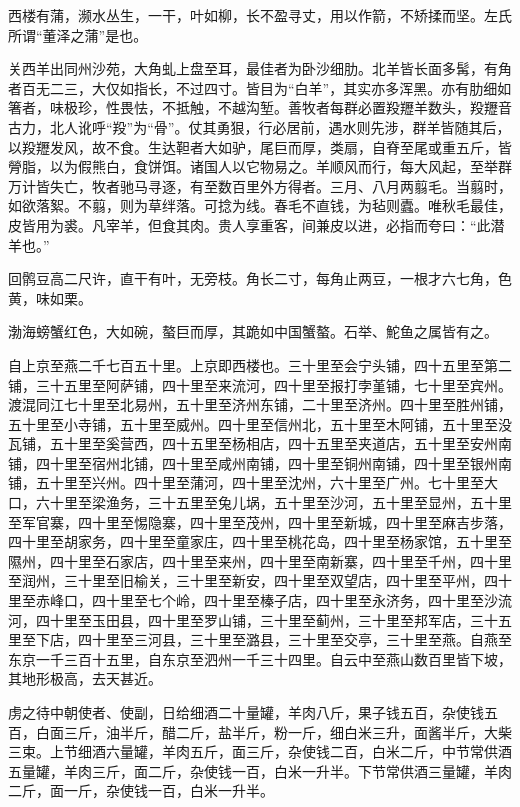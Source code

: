 \documentclass[]{article}
\begin{document}
西楼有蒲，濒水丛生，一干，叶如柳，长不盈寻丈，用以作箭，不矫揉而坚。左氏所谓``董泽之蒲''是也。

关西羊出同州沙苑，大角虬上盘至耳，最佳者为卧沙细肋。北羊皆长面多髯，有角者百无二三，大仅如指长，不过四寸。皆目为``白羊''，其实亦多浑黑。亦有肋细如箸者，味极珍，性畏怯，不抵触，不越沟堑。善牧者每群必置羖䍽羊数头，羖䍽音古力，北人讹呼``羖''为``骨''。仗其勇狠，行必居前，遇水则先涉，群羊皆随其后，以羖䍽发风，故不食。生达靼者大如驴，尾巨而厚，类扇，自脊至尾或重五斤，皆膋脂，以为假熊白，食饼饵。诸国人以它物易之。羊顺风而行，每大风起，至举群万计皆失亡，牧者驰马寻逐，有至数百里外方得者。三月、八月两翦毛。当翦时，如欲落絮。不翦，则为草绊落。可捻为线。春毛不直钱，为毡则蠹。唯秋毛最佳，皮皆用为裘。凡宰羊，但食其肉。贵人享重客，间兼皮以进，必指而夸曰：``此潜羊也。''

回鹘豆高二尺许，直干有叶，无旁枝。角长二寸，每角止两豆，一根才六七角，色黄，味如栗。

渤海螃蟹红色，大如碗，螯巨而厚，其跪如中国蟹螯。石举、鮀鱼之属皆有之。

自上京至燕二千七百五十里。上京即西楼也。三十里至会宁头铺，四十五里至第二铺，三十五里至阿萨铺，四十里至来流河，四十里至报打孛堇铺，七十里至宾州。渡混同江七十里至北易州，五十里至济州东铺，二十里至济州。四十里至胜州铺，五十里至小寺铺，五十里至威州。四十里至信州北，五十里至木阿铺，五十里至没瓦铺，五十里至奚营西，四十五里至杨相店，四十五里至夹道店，五十里至安州南铺，四十里至宿州北铺，四十里至咸州南铺，四十里至铜州南铺，四十里至银州南铺，五十里至兴州。四十里至蒲河，四十里至沈州，六十里至广州。七十里至大口，六十里至梁渔务，三十五里至兔儿埚，五十里至沙河，五十里至显州，五十里至军官寨，四十里至惕隐寨，四十里至茂州，四十里至新城，四十里至麻吉步落，四十里至胡家务，四十里至童家庄，四十里至桃花岛，四十里至杨家馆，五十里至隰州，四十里至石家店，四十里至来州，四十里至南新寨，四十里至千州，四十里至润州，三十里至旧榆关，三十里至新安，四十里至双望店，四十里至平州，四十里至赤峰口，四十里至七个岭，四十里至榛子店，四十里至永济务，四十里至沙流河，四十里至玉田县，四十里至罗山铺，三十里至蓟州，三十里至邦军店，三十五里至下店，四十里至三河县，三十里至潞县，三十里至交亭，三十里至燕。自燕至东京一千三百十五里，自东京至泗州一千三十四里。自云中至燕山数百里皆下坡，其地形极高，去天甚近。

虏之待中朝使者、使副，日给细酒二十量罐，羊肉八斤，果子钱五百，杂使钱五百，白面三斤，油半斤，醋二斤，盐半斤，粉一斤，细白米三升，面酱半斤，大柴三束。上节细酒六量罐，羊肉五斤，面三斤，杂使钱二百，白米二斤，中节常供酒五量罐，羊肉三斤，面二斤，杂使钱一百，白米一升半。下节常供酒三量罐，羊肉二斤，面一斤，杂使钱一百，白米一升半。
\end{document}
